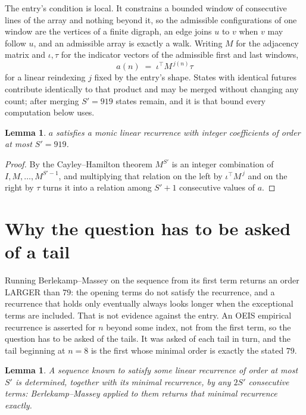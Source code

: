 \documentclass[11pt,a4paper]{article}
\theoremstyle{plain}
\newtheorem{lemma}[theorem]{Lemma}
\theoremstyle{definition}
\begin{document}
The entry's condition is local. It constrains a bounded window of consecutive lines of the
array and nothing beyond it, so the admissible configurations of one window are the vertices of
a finite digraph, an edge joins $u$ to $v$ when $v$ may follow $u$, and an admissible array is
exactly a walk. Writing $M$ for the adjacency matrix and $\iota,\tau$ for the indicator vectors
of the admissible first and last windows,
\[
a(n)\;=\;\iota^{\!\top}M^{\,j(n)}\tau
\]
for a linear reindexing $j$ fixed by the entry's shape. States with identical futures
contribute identically to that product and may be merged without changing any count; after
merging $S'=919$ states remain, and it is that bound every computation below uses.

\begin{lemma}\label{lem:cf}
$a$ satisfies a monic linear recurrence with integer coefficients of order at most $S'=919$.
\end{lemma}

\begin{proof}
By the Cayley--Hamilton theorem $M^{S'}$ is an integer combination of $I,M,\dots,M^{S'-1}$,
and multiplying that relation on the left by $\iota^{\!\top}M^{\,j}$ and on the right by
$\tau$ turns it into a relation among $S'+1$ consecutive values of $a$.
\end{proof}

\section{Why the question has to be asked of a tail}

Running Berlekamp--Massey on the sequence from its first term returns an order LARGER than $79$: the opening terms do not satisfy the recurrence, and a recurrence that holds only eventually always looks longer when the exceptional terms are included. That is not evidence against the entry. An OEIS empirical recurrence is asserted for $n$ beyond some index, not from the first term, so the question has to be asked of the tails. It was asked of each tail in turn, and the tail beginning at $n=8$ is the first whose minimal order is exactly the stated $79$.

\begin{lemma}\label{lem:bm}
A sequence known to satisfy some linear recurrence of order at most $S'$ is determined,
together with its minimal recurrence, by any $2S'$ consecutive terms: Berlekamp--Massey applied
to them returns that minimal recurrence exactly.
\end{lemma}
\end{document}

